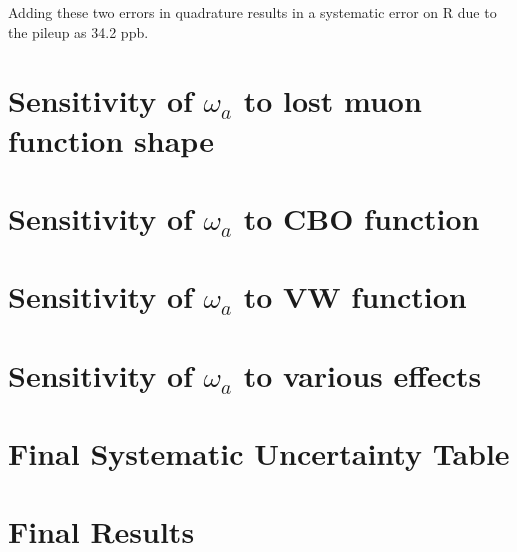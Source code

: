 Adding these two errors in quadrature results in a systematic error on R due to the pileup as 34.2 ppb.



\section{Sensitivity of \texorpdfstring{$\omega_{a}$}{} to lost muon function shape}

\section{Sensitivity of \texorpdfstring{$\omega_{a}$}{} to CBO function}

\section{Sensitivity of \texorpdfstring{$\omega_{a}$}{} to VW function}

\section{Sensitivity of \texorpdfstring{$\omega_{a}$}{} to various effects}

\section{Final Systematic Uncertainty Table}

\section{Final Results}
